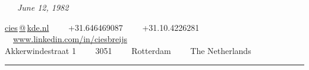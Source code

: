 \documentclass[10pt,a4paper]{article}
\begin{document}

\ \ \ \emph{June 12, 1982}


\vspace{0.3em}
\hspace{-\parindent}\href{mailto:cies at kde.nl}{cies$\,\!$@$\,\!$kde.nl}\ \ \textbullet  %
\ \ +31.646469087\ \ \textbullet
\ \ +31.10.4226281\ \ \textbullet
\ \ \href{http://www.linkedin.com/in/ciesbreijs}{www.linkedin.com/in/ciesbreijs}
\\
Akkerwindestraat 1\ \ \textbullet
\ \ 3051\thinspace {}\ \ \textbullet
\ \ Rotterdam\ \ \textbullet
\ \ The Netherlands

\vspace{1.1em}
\hrule
\vspace{-0.4em}
\end{document}
